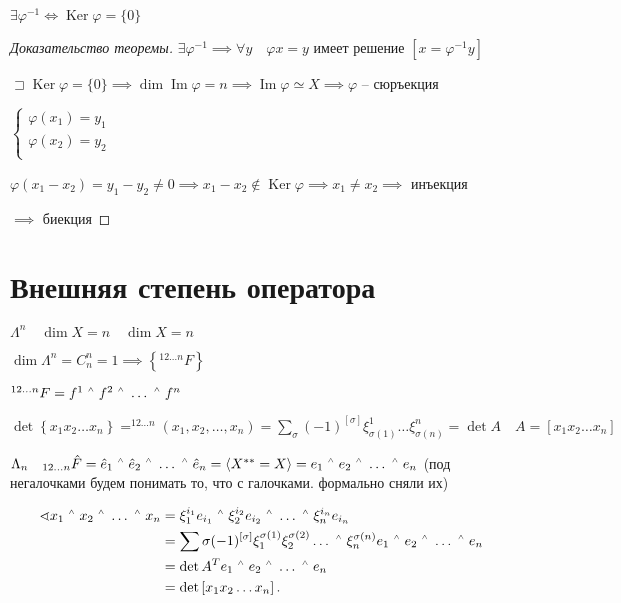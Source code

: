 \documentclass{book}
\DeclareMathOperator{\Image}{Im}
\DeclareMathOperator{\Ker}{Ker}
\let\latexwedge\wedge
\def\wedge{\,\raisebox{0.5ex}{\ensuremath{\scriptscriptstyle\latexwedge}\,}}
\theoremstyle{definition}
\begin{document}
\begin{statement}
    $\exists \varphi^{-1} \iff \Ker\varphi = \{0\}$
\end{statement}
\begin{proof}
    [Доказательство теоремы]

    $\exists \varphi^{-1} \implies \forall y\quad \varphi x = y$ имеет решение $\left[ x = \varphi^{-1}y \right] $

    $\sqsupset \Ker\varphi = \{0\} \implies \dim \Image \varphi = n \implies \Image \varphi \simeq X \implies \varphi$ -- сюръекция

     $\begin{cases}
         \varphi(x_1) = y_1\\
         \varphi(x_2) = y_2\\
     \end{cases}$ 

     $\varphi\left( x_1-x_2 \right) =y_1-y_2\neq 0 \implies  x_1-x_2\not\in \Ker\varphi \implies x_1\neq x_2 \implies $ инъекция

     $\implies $ биекция
\end{proof}

\section{Внешняя степень оператора}

$\Lambda^n\quad \dim X = n\quad \dim X = n$

$\dim \Lambda^n = C^n_n = 1 \implies \left\{ ^{12\ldots n}F \right\} $ 

$^{12 \ldots n}F = f^1\wedge f^2\wedge \ldots \wedge f^n$

$\det \left\{ x_1x_2 \ldots x_n \right\}  = ^{12\ldots n}\left( x_1, x_2, \ldots, x_n \right)  = \sum_{\sigma}(-1)^{\left[ \sigma \right] }\xi^1_{\sigma(1)} \ldots \xi^n_{\sigma(n)} = \det A\quad A = \left[ x_1x_2 \ldots x_{n}  \right] $

$\Lambda_n\quad {}_{12 \ldots n}\hat F = \hat e_1 \wedge \hat e_2\wedge \ldots \wedge \hat e_n = \left<X^{* * } = X \right> = e_1\wedge e_2\wedge \ldots \wedge e_n$ (под негалочками будем понимать то, что с галочками. формально сняли их)

\begin{align*}    
    \sphericalangle x_1\wedge x_2 \wedge \ldots \wedge x_n &= \xi^{i_1}_1e_{i_1}\wedge\xi^{i_2}_2e_{i_2}\wedge \ldots \wedge \xi^{i_n}_ne_{i_n} \\
                                                           &= \sum{\sigma}(-1)^{\left[ \sigma \right] }\xi_1^{\sigma(1)}\xi_2^{\sigma(2)} \ldots \wedge \xi_n^{\sigma(n)} e_1\wedge e_2\wedge \ldots \wedge e_n\\
                                                           &= \det A^T e_1\wedge e_2\wedge \ldots \wedge e_n\\
                                                           &=\det \left[ x_1 x_2 \ldots x_n \right] 
.\end{align*}
\end{document}
